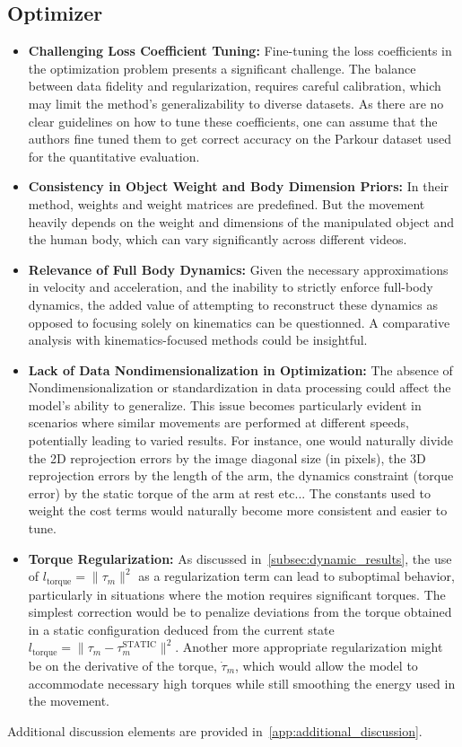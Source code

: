 \subsection{Optimizer}
\begin{itemize}
    \item \textbf{Challenging Loss Coefficient Tuning:} Fine-tuning the loss coefficients in the optimization problem presents a significant 
    challenge. The balance between data fidelity and regularization, requires careful calibration, which may 
    limit the method's generalizability to diverse datasets. As there are no clear guidelines on how to tune these coefficients, one can
    assume that the authors fine tuned them to get correct accuracy on the Parkour dataset used for the quantitative evaluation.

    \item \textbf{Consistency in Object Weight and Body Dimension Priors:} In their method, weights and weight matrices are predefined. 
    But the movement heavily depends on the weight and dimensions of the manipulated object and the human body, which can vary significantly 
    across different videos. 

    \item \textbf{Relevance of Full Body Dynamics:} Given the necessary approximations in velocity and acceleration, and the inability to 
    strictly enforce full-body dynamics, the added value of attempting to reconstruct these dynamics as opposed to focusing 
    solely on kinematics can be questionned. A comparative analysis with kinematics-focused methods could be insightful.

    \item \textbf{Lack of Data Nondimensionalization in Optimization:} The absence of Nondimensionalization or standardization in data processing could 
    affect the model's ability to generalize.
    This issue becomes particularly evident in scenarios where similar movements are performed at 
    different speeds, potentially leading to varied results.
    For instance, one would naturally divide the 2D reprojection errors by the image diagonal size (in pixels), the 3D reprojection errors by the length of the arm,
    the dynamics constraint (torque error) by the static torque of the arm at rest etc... 
    The constants used to weight the cost terms would naturally become more consistent and easier to tune.

    \item \textbf{Torque Regularization:} As discussed in~\cref{subsec:dynamic_results}, the use 
    of \(l_{\text{torque}} = \|\tau_m\|^2\) as a regularization term can lead to suboptimal 
    behavior, particularly in situations where the motion requires significant torques. 
    The simplest correction would be to penalize deviations from the torque obtained in a static configuration deduced from the current state \(l_{\text{torque}} = \|\tau_m - \tau_m^{\textrm{STATIC}} \|^2\).
    Another more appropriate regularization might be on the derivative of the torque, \(\dot{\tau}_m\), which 
    would allow the model to accommodate necessary high torques while still smoothing the energy used in the movement.

\end{itemize}

Additional discussion elements are provided in~\cref{app:additional_discussion}.